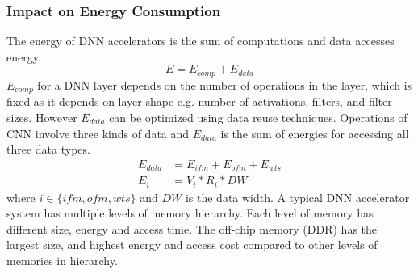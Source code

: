 \documentclass[a4paper,10pt]{article}
\begin{document}
\subsubsection{Impact on Energy Consumption}
The energy of DNN accelerators is the sum of computations and data accesses energy. 
\begin{equation}
	E=E_{comp} + E_{data}
\end{equation}
$E_{comp}$ for a DNN layer depends on the number of operations in the layer, which is fixed as it depends on layer shape e.g. number of activations, filters, and filter sizes. However $E_{data}$ can be optimized using data reuse techniques. Operations of CNN involve three kinds of data and $E_{data}$ is the sum of energies for accessing all three data types.
\begin{align}
	E_{data}&=E_{ifm}+E_{ofm}+E_{wts} \\
	E_{i}&=V_{i}*R_{i}*DW
\end{align}
where $i\in \{ifm,ofm,wts\}$ and $DW$ is the data width. A typical DNN accelerator system has multiple levels of memory hierarchy. Each level of memory has different size, energy and access time. The off-chip memory (DDR) has the largest size, and highest energy and access cost compared to other levels of memories in hierarchy.  
\end{document}
